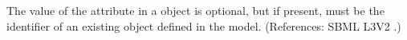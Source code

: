 The value of the attribute  in a \Reaction object is
optional, but if present, must be the identifier of an existing
\Compartment object defined in the model.  (References: SBML L3V2
.)
